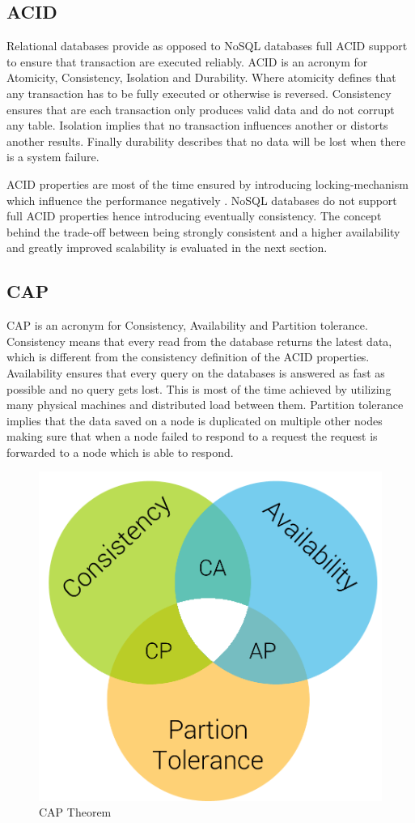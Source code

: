 \subsection{ACID}
\label{subsec:acid}
Relational databases provide as opposed to \ac{NoSQL} databases full ACID support to ensure that transaction are executed reliably. ACID is an acronym for Atomicity, Consistency, Isolation and Durability. Where atomicity defines that any transaction has to be fully executed or otherwise is reversed. Consistency ensures that are each transaction only produces valid data and do not corrupt any table. Isolation implies that no transaction influences another or distorts another results. Finally durability describes that no data will be lost when there is a system failure. \cite[71]{pokorny.2011}

ACID properties are most of the time ensured by introducing locking-mechanism which influence the performance negatively \cite[1]{hecht.2011}. NoSQL databases do not support full ACID properties hence introducing eventually consistency. The concept behind the trade-off between being strongly consistent and a higher availability and greatly improved scalability is evaluated in the next section.


\subsection{CAP}
\label{subsec:cap}
CAP is an acronym for Consistency, Availability and Partition tolerance. Consistency means that every read from the database returns the latest data, which is different from the consistency definition of the ACID properties. Availability ensures that every query on the databases is answered as fast as possible and no query gets lost. This is most of the time achieved by utilizing many physical machines and distributed load between them. Partition tolerance implies that the data saved on a node is duplicated on multiple other nodes making sure that when a node failed to respond to a request the request is forwarded to a node which is able to respond. \cite[72]{pokorny.2011}

\begin{figure}[H]
  \centering
  \includegraphics[width=.4\textwidth]{Figures/cap.png}
  \caption[CAP Theorem]{CAP Theorem}
  \label{fig:cap-theorem}
\end{figure}

